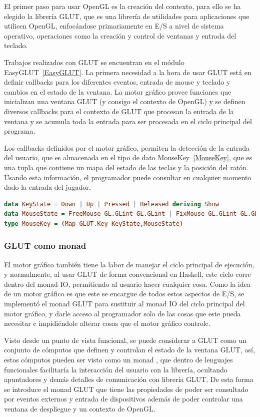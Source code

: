 El primer paso para usar OpenGL es la creación del contexto, para ello se ha elegido la librería GLUT, que es una librería de utilidades para aplicaciones que utilicen OpenGL, enfocándose primariamente en E/S a nivel de sistema operativo, operaciones como la creación y control de ventanas y entrada del teclado.

Trabajos realizados con GLUT se encuentran en el módulo EasyGLUT~\ref{EasyGLUT}. La primera necesidad a la hora de usar GLUT está en definir callbacks para los diferentes eventos, entrada de mouse y teclado y cambios en el estado de la ventana. La motor gráfico provee funciones que inicializan una ventana GLUT (y consigo el contexto de OpenGL) y se definen diversos callbacks para el contexto de GLUT que procesan la entrada de la ventana y se acumula toda la entrada para ser procesada en el ciclo principal del programa.

Los callbacks definidos por el motor gráfico, permiten la detección de la entrada del usuario, que es almacenada en el tipo de dato MouseKey~\ref{MouseKey}, que es una tupla que contiene un mapa del estado de las teclas y la posición del ratón. Usando esta información, el programador puede consultar en cualquier momento dado la entrada del jugador.

\begin{lstlisting}[label={MouseKey},frame=single,language=Haskell]
data KeyState = Down | Up | Pressed | Released deriving Show
data MouseState = FreeMouse GL.GLint GL.GLint | FixMouse GL.GLint GL.GLint
type MouseKey = (Map GLUT.Key KeyState,MouseState)
\end{lstlisting}

\subsubsection{GLUT como monad}

El motor gráfico también tiene la labor de manejar el ciclo principal de ejecución, y normalmente, al usar GLUT de forma convencional en Haskell, este ciclo corre dentro del monad IO, permitiendo al usuario hacer cualquier cosa. Como la idea de un motor gráfico es que este se encargue de todos estos aspectos de E/S, se implementó el monad GLUT para sustituir al monad IO del ciclo principal del motor gráfico, y darle acceso al programador solo de las cosas que este pueda necesitar e impidiéndole alterar cosas que el motor gráfico controle.

Visto desde un punto de vista funcional, se puede considerar a GLUT como  un conjunto de cómputos que definen y controlan el estado de la ventana GLUT, así, estos cómputos pueden ser visto como un monad \cite{moggi1991notions} \cite{wiki:MonadsComputation} \cite{wiki:MonadsContainers}, que dentro de lenguajes funcionales facilitaría la interacción del usuario con la librería, ocultando apuntadores y demás detalles de comunicación con librería GLUT. De esta forma se introduce el monad GLUT que tiene las propiedades de poder ser consultado por eventos externos y entrada de dispositivos además de poder controlar una ventana de despliegue y un contexto de OpenGL.

